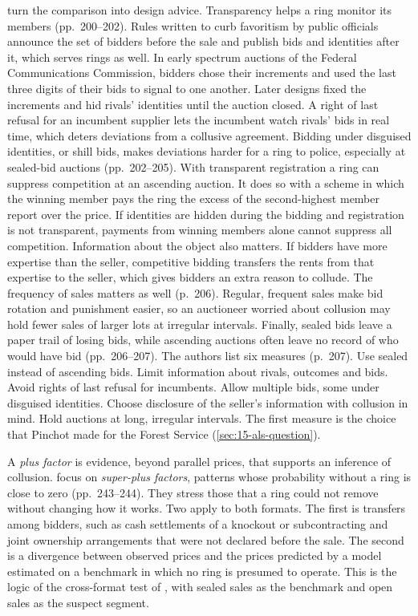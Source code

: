 \citet[ch.~10]{MarshallMarx2012} turn the comparison into design advice. Transparency helps a ring monitor
its members (pp.~200--202). Rules written to curb favoritism by public officials announce the set of
bidders before the sale and publish bids and identities after it, which serves rings as well. In early
spectrum auctions of the Federal Communications Commission, bidders chose their increments and used the last
three digits of their bids to signal to one another. Later designs fixed the increments and hid rivals'
identities until the auction closed. A right of last refusal for an incumbent supplier lets the incumbent
watch rivals' bids in real time, which deters deviations from a collusive agreement. Bidding under
disguised identities, or shill bids, makes deviations harder for a ring to police, especially at sealed-bid
auctions (pp.~202--205). With transparent registration a ring can suppress competition at an ascending
auction. It does so with a scheme in which the winning member pays the ring the excess of the
second-highest member report over the price. If identities are hidden during the bidding and registration
is not transparent, payments from winning members alone cannot suppress all competition. Information about
the object also matters. If bidders have more expertise than the seller, competitive bidding transfers the
rents from that expertise to the seller, which gives bidders an extra reason to collude. The frequency of
sales matters as well (p.~206). Regular, frequent sales make bid rotation and punishment easier, so an
auctioneer worried about collusion may hold fewer sales of larger lots at irregular intervals. Finally,
sealed bids leave a paper trail of losing bids, while ascending auctions often leave no record of who would
have bid (pp.~206--207). The authors list six measures (p.~207). Use sealed instead of ascending bids. Limit
information about rivals, outcomes and bids. Avoid rights of last refusal for incumbents. Allow multiple bids,
some under disguised identities. Choose disclosure of the seller's information with collusion in mind. Hold
auctions at long, irregular intervals. The first measure is the choice that Pinchot made for the Forest
Service (\cref{sec:15-als-question}).

A \emph{plus factor} is evidence, beyond parallel prices, that supports an inference of collusion.
\citet[ch.~12]{MarshallMarx2012} focus on \emph{super-plus factors}, patterns whose probability without a
ring is close to zero (pp.~243--244). They stress those that a ring could not remove without changing how it
works. Two apply to both formats. The first is transfers among bidders, such as cash settlements
of a knockout or subcontracting and joint ownership arrangements that were not declared before the sale. The
second is a divergence between observed prices and the prices predicted by a model estimated on a
benchmark in which no ring is presumed to operate. This is the logic of the cross-format test of
\citet{AtheyLevinSeira2011}, with sealed sales as the benchmark and open sales as the suspect segment.

